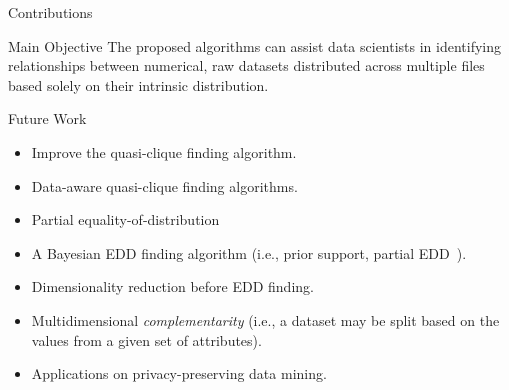 \documentclass[10pt,notes]{beamer}
\begin{document}
\begin{frame}{Contributions}

\begin{block}{ Main Objective}
    The proposed algorithms can assist data scientists in identifying relationships
    between numerical, raw datasets distributed across multiple files
    based solely on their intrinsic distribution.
\end{block}

\end{frame}


\begin{frame}{Future Work}
    \begin{itemize}
        \item Improve the quasi-clique finding algorithm.
                
        \item Data-aware quasi-clique finding algorithms.
        
        \item \alert{Partial equality-of-distribution}
                
        \item A Bayesian EDD finding algorithm (i.e., prior support, partial EDD~\cite{soriano2015bayesian}).
        
        \item Dimensionality reduction before EDD finding.
            
        \item \alert{Multidimensional \emph{complementarity}} (i.e., a dataset may be split 
        based on the values from a given set of attributes).

        \item Applications on privacy-preserving data mining.
    \end{itemize}

\end{frame}
\end{document}
